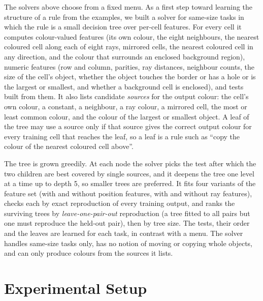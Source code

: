 \documentclass[sigconf,nonacm]{acmart}
\begin{document}
The solvers above choose from a fixed menu. As a first step toward learning the structure of a rule from the examples, we built a solver for same-size tasks in which the rule is a small decision tree over per-cell features. For every cell it computes colour-valued features (its own colour, the eight neighbours, the nearest coloured cell along each of eight rays, mirrored cells, the nearest coloured cell in any direction, and the colour that surrounds an enclosed background region), numeric features (row and column, parities, ray distances, neighbour counts, the size of the cell's object, whether the object touches the border or has a hole or is the largest or smallest, and whether a background cell is enclosed), and tests built from them. It also lists candidate \emph{sources} for the output colour: the cell's own colour, a constant, a neighbour, a ray colour, a mirrored cell, the most or least common colour, and the colour of the largest or smallest object. A leaf of the tree may use a source only if that source gives the correct output colour for every training cell that reaches the leaf, so a leaf is a rule such as ``copy the colour of the nearest coloured cell above''.

The tree is grown greedily. At each node the solver picks the test after which the two children are best covered by single sources, and it deepens the tree one level at a time up to depth 5, so smaller trees are preferred. It fits four variants of the feature set (with and without position features, with and without ray features), checks each by exact reproduction of every training output, and ranks the surviving trees by \emph{leave-one-pair-out} reproduction (a tree fitted to all pairs but one must reproduce the held-out pair), then by tree size. The tests, their order and the leaves are learned for each task, in contrast with a menu. The solver handles same-size tasks only, has no notion of moving or copying whole objects, and can only produce colours from the sources it lists.

\section{Experimental Setup}
\end{document}

